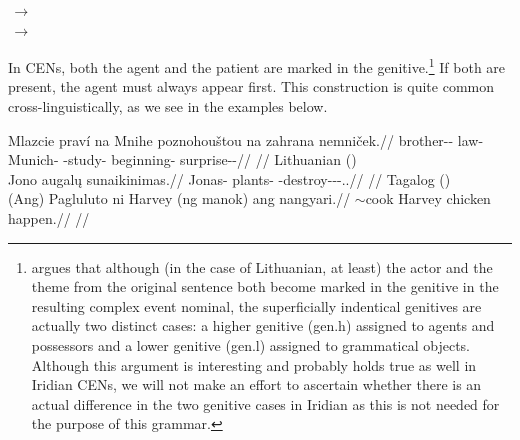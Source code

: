 \begin{multicols}{2}
\pex
    \a {}\,$\rightarrow$\,\\
    \a {}\,$\rightarrow$\,\\
\xe
\end{multicols}

In CENs, both the agent and the patient are marked in the genitive.\footnote{\textcite{serekaite2020} argues that although (in the case of Lithuanian, at least) the actor and the theme from the original sentence both become marked in the genitive in the resulting complex event nominal, the superficially indentical genitives are actually two distinct cases: a higher genitive ({\sc gen.h}) assigned to agents and possessors and a lower genitive ({\sc gen.l}) assigned to grammatical objects. Although this argument is interesting and probably holds true as well in Iridian CENs, we will not make an effort to ascertain whether there is an actual difference in the two genitive cases in Iridian as this is not needed for the purpose of this grammar.} If both are present, the agent must always appear first. This construction is quite common cross-linguistically, as we see in the examples below.

\pex
\a\begingl
    \gla Mlazcie prav\'i na Mnihe poznohouštou na zahrana nemni\v{c}ek.//
    \glb brother-\Dim{}-\Gen{} law-\Gen{} \Loc{} Munich-\Pat{} \Ger{}-study-\Nz{} \Loc{} beginning-\Pat{} surprise-\Av{}-\Pf{}//
    \glft {}//
\endgl
\a Lithuanian (\cite[1]{serekaite2020})\\
\begingl
    \gla Jono augal\k{u} sunaikinimas.//
    \glb Jonas-\Gen{} plants-\Gen{} \Pfv{}-destroy-\Caus{}-\Nz-\Nom{}.\M{}.\Sg{}//
    \glft {}//
\endgl
\a Tagalog (\cite[22]{hsieh2019})\\
\begingl
    \gla (Ang) Pagluluto ni Harvey (ng manok) ang nangyari.//
    \glb \Nom{} \Ger{}$\sim$cook \Gen{} Harvey \Gen{} chicken \Nom{} happen.\Pfv{}//
    \glft {}//
\endgl
\xe

